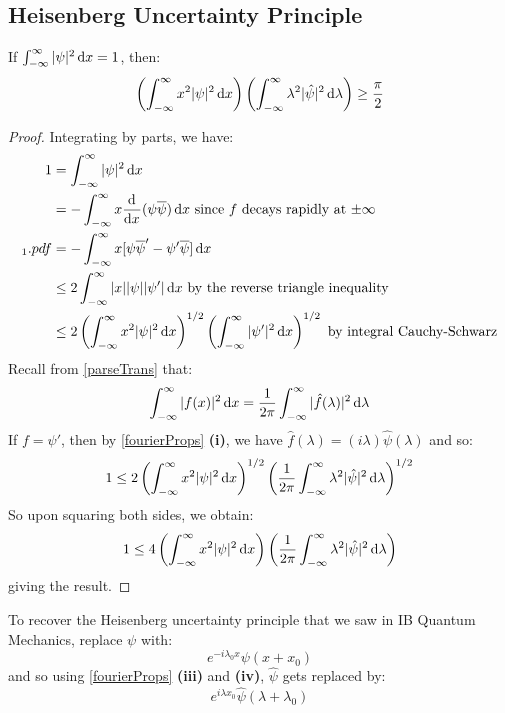 \documentclass[../main.tex]{subfiles}
\begin{document}
\subsection{Heisenberg Uncertainty Principle}
\begin{proposition}
  If $\int_{-\infty}^{\infty} |\psi|^2 \d{x} = 1$, then: \label{HBU}
  \[
    \left(\int_{-\infty}^{\infty} x^2 |\psi|^2 \d{x}\right)\left(\int_{-\infty}^{\infty} \lambda^2 |\hat{\psi}|^2 \d{\lambda}\right) \geq \frac{\pi}{2}
  \]
\end{proposition}
\begin{proof}
  Integrating by parts, we have:
  \begin{align*}
    1 &= \int_{-\infty}^{\infty} |\psi|^2 \d{x} \\
      &= - \int_{-\infty}^{\infty} x \deriv{}{x}(\psi \overline{\psi}) \d{x} \text{ since $f$ decays rapidly at $\pm \infty$} \\_1.pdf
      &= - \int_{-\infty}^{\infty} x[\psi \overline{\psi}' - \psi' \overline{\psi}] \d{x} \\
      &\leq 2\int_{-\infty}^{\infty} |x||\psi||\psi'| \d{x} \text{ by the reverse triangle inequality}\\
      &\leq 2\left(\int_{-\infty}^{\infty} x^2 |\psi|^2 \d{x}\right)^{1/2}\left(\int_{-\infty}^{\infty} |\psi'|^2 \d{x}\right)^{1/2} \text{ by integral Cauchy-Schwarz}
  \end{align*}
  Recall from \cref{parseTrans} that:
  \[
    \int_{-\infty}^{\infty} |f(x)|^2 \d{x} = \frac{1}{2\pi} \int_{-\infty}^{\infty} |\hat{f}(\lambda)|^2 \d{\lambda}
  \]
  If $f = \psi'$, then by \cref{fourierProps} \textbf{(i)}, we have $\hat{f}(\lambda) = (i \lambda) \hat{\psi}(\lambda)$ and so:
  \begin{align*}
    1 \leq 2\left(\int_{-\infty}^{\infty} x^2 |\psi|^2 \d{x}\right)^{1/2}\left(\frac{1}{2\pi} \int_{-\infty}^{\infty} \lambda^2 |\hat{\psi}|^2 \d{\lambda}\right)^{1/2}
  \end{align*}
  So upon squaring both sides, we obtain:
  \[
    1 \leq 4\left(\int_{-\infty}^{\infty} x^2 |\psi|^2 \d{x}\right)\left(\frac{1}{2\pi} \int_{-\infty}^{\infty} \lambda^2 |\hat{\psi}|^2 \d{\lambda}\right)
  \]
  giving the result.
\end{proof}
To recover the Heisenberg uncertainty principle that we saw in IB Quantum Mechanics, replace $\psi$ with:
\[
  e^{-i \lambda_0 x} \psi(x + x_0)
\]
and so using \cref{fourierProps} \textbf{(iii)} and \textbf{(iv)}, $\hat{\psi}$ gets replaced by:
\[
  e^{i \lambda x_0} \hat{\psi}(\lambda + \lambda_0)
\]
\end{document}
